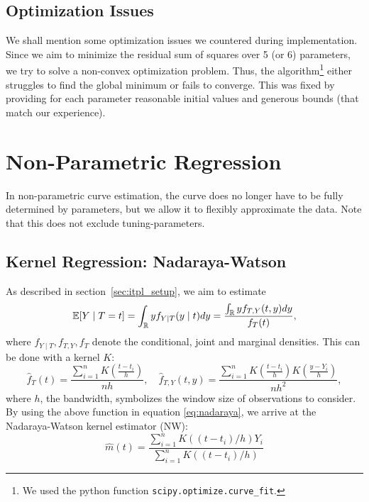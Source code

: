 	\subsection{Optimization Issues}\label{sec:itpl_param_optimizationissues}
		We shall mention some optimization issues we countered during implementation. Since we aim to minimize the residual sum of squares over 5 (or 6) parameters, we try to solve a non-convex optimization problem. Thus, the algorithm\footnote{We used the python function \texttt{scipy.optimize.curve\_fit}.} either struggles to find the global minimum or fails to converge. This was fixed by providing for each parameter reasonable initial values and generous bounds (that match our experience).

\section{Non-Parametric Regression}
	\label{sec:itpl_nonparametric}
	In non-parametric curve estimation, the curve does no longer have to be fully determined by parameters, but we allow it to flexibly approximate the data. Note that this does not exclude tuning-parameters.

	\subsection{Kernel Regression: Nadaraya-Watson}
		\label{sec:Kernel}
		As described in section~\ref{sec:itpl_setup}, we aim to estimate
		\begin{equation}
			\label{eq:nadaraya}
			\mathbb{E}[Y \mid T=t]
			= \int_{\mathbb{R}} y f_{Y \mid T}(y \mid t) d y
			=\frac{\int_{\mathbb{R}} y f_{T, Y}(t, y) d y}{f_{T}(t)},
		\end{equation}
		where $f_{Y \mid T}, f_{T, Y}, f_{T}$ denote the conditional, joint and marginal densities.
		This can be done with a kernel $K$:
		\begin{equation}
			\hat{f}_{T}(t)=\frac{\sum_{i=1}^{n} K\left(\frac{t-t_{i}}{h}\right)}{n h}, \quad \hat{f}_{T, Y}(t, y)=\frac{\sum_{i=1}^{n} K\left(\frac{t-t_{i}}{h}\right) K\left(\frac{y-Y_{i}}{h}\right)}{n h^{2}},
			\label{eq:kernel_with_bandwidt}
		\end{equation}
		where $h$, the bandwidth, symbolizes the window size of observations to consider. By using the above function in equation \eqref{eq:nadaraya}, we arrive at the Nadaraya-Watson kernel estimator (NW):
		$$\hat{m}(t)=\frac{\sum_{i=1}^{n} K\left(\left(t-t_{i}\right) / h\right) Y_{i}}{\sum_{i=1}^{n} K\left(\left(t-t_{i}\right) / h\right)}$$

